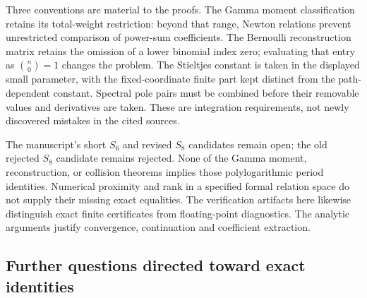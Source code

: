 \documentclass[11pt,a4paper]{article}
\numberwithin{equation}{section}
\theoremstyle{definition}
\theoremstyle{remark}
\begin{document}
Three conventions are material to the proofs. The Gamma moment
classification retains its total-weight restriction: beyond that range,
Newton relations prevent unrestricted comparison of power-sum
coefficients. The Bernoulli reconstruction matrix retains the omission
of a lower binomial index zero; evaluating that entry as
$\binom n0=1$ changes the problem. The Stieltjes constant is taken in
the displayed small parameter, with the fixed-coordinate finite part
kept distinct from the path-dependent constant. Spectral pole pairs
must be combined before their removable values and derivatives are
taken. These are integration requirements, not newly discovered
mistakes in the cited sources.

The manuscript's short $S_6$ and revised $S_8$ candidates remain open;
the old rejected $S_8$ candidate remains rejected. None of the Gamma
moment, reconstruction, or collision theorems implies those polylogarithmic
period identities. Numerical proximity and rank in a specified formal
relation space do not supply their missing exact equalities.
The verification artifacts here likewise distinguish exact finite
certificates from floating-point diagnostics. The analytic arguments
justify convergence, continuation and coefficient extraction.

\subsection{Further questions directed toward exact identities}
\end{document}
